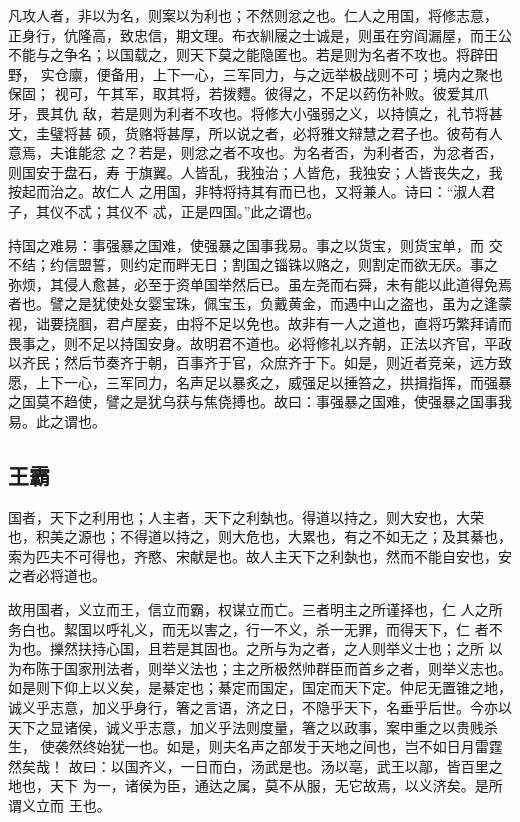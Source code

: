 \documentclass[]{article}
\begin{document}
凡攻人者，非以为名，则案以为利也；不然则忿之也。仁人之用国，将修志意，
正身行，伉隆高，致忠信，期文理。布衣紃屦之士诚是，则虽在穷阎漏屋，而王公
不能与之争名；以国载之，则天下莫之能隐匿也。若是则为名者不攻也。将辟田野，
实仓廪，便备用，上下一心，三军同力，与之远举极战则不可；境内之聚也保固；
视可，午其军，取其将，若拨麷。彼得之，不足以药伤补败。彼爱其爪牙，畏其仇
敌，若是则为利者不攻也。将修大小强弱之义，以持慎之，礼节将甚文，圭璧将甚
硕，货赂将甚厚，所以说之者，必将雅文辩慧之君子也。彼苟有人意焉，夫谁能忿
之？若是，则忿之者不攻也。为名者否，为利者否，为忿者否，则国安于盘石，寿
于旗翼。人皆乱，我独治；人皆危，我独安；人皆丧失之，我按起而治之。故仁人
之用国，非特将持其有而已也，又将兼人。诗曰：``淑人君子，其仪不忒；其仪不
忒，正是四国。''此之谓也。

持国之难易：事强暴之国难，使强暴之国事我易。事之以货宝，则货宝单，而
交不结；约信盟誓，则约定而畔无日；割国之锱铢以赂之，则割定而欲无厌。事之
弥烦，其侵人愈甚，必至于资单国举然后已。虽左尧而右舜，未有能以此道得免焉
者也。譬之是犹使处女婴宝珠，佩宝玉，负戴黄金，而遇中山之盗也，虽为之逢蒙
视，诎要挠腘，君卢屋妾，由将不足以免也。故非有一人之道也，直将巧繁拜请而
畏事之，则不足以持国安身。故明君不道也。必将修礼以齐朝，正法以齐官，平政
以齐民；然后节奏齐于朝，百事齐于官，众庶齐于下。如是，则近者竞亲，远方致
愿，上下一心，三军同力，名声足以暴炙之，威强足以捶笞之，拱揖指挥，而强暴
之国莫不趋使，譬之是犹乌获与焦侥搏也。故曰：事强暴之国难，使强暴之国事我
易。此之谓也。

\hypertarget{header-n52}{%
\subsection{王霸}\label{header-n52}}

国者，天下之利用也；人主者，天下之利埶也。得道以持之，则大安也，大荣
也，积美之源也；不得道以持之，则大危也，大累也，有之不如无之；及其綦也，
索为匹夫不可得也，齐愍、宋献是也。故人主天下之利埶也，然而不能自安也，安
之者必将道也。

故用国者，义立而王，信立而霸，权谋立而亡。三者明主之所谨择也，仁
人之所务白也。絜国以呼礼义，而无以害之，行一不义，杀一无罪，而得天下，仁
者不为也。擽然扶持心国，且若是其固也。之所与为之者，之人则举义士也；之所
以为布陈于国家刑法者，则举义法也；主之所极然帅群臣而首乡之者，则举义志也。
如是则下仰上以义矣，是綦定也；綦定而国定，国定而天下定。仲尼无置锥之地，
诚义乎志意，加义乎身行，箸之言语，济之日，不隐乎天下，名垂乎后世。今亦以
天下之显诸侯，诚义乎志意，加义乎法则度量，箸之以政事，案申重之以贵贱杀生，
使袭然终始犹一也。如是，则夫名声之部发于天地之间也，岂不如日月雷霆然矣哉！
故曰：以国齐义，一日而白，汤武是也。汤以亳，武王以鄗，皆百里之地也，天下
为一，诸侯为臣，通达之属，莫不从服，无它故焉，以义济矣。是所谓义立而
王也。
\end{document}
